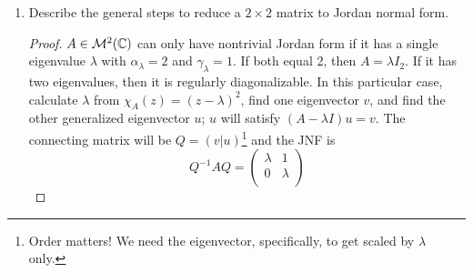 \documentclass[../psets.tex]{subfiles}
\begin{document}
\begin{enumerate}
\begin{proof}
        \begin{equation*}
            J =
            \begin{pmatrix}
                \lambda & 1 &  & 0\\
                 & \lambda & \ddots & \\
                 &  & \ddots & 1\\
                0 &  &  & \lambda\\
            \end{pmatrix}
        \end{equation*}
        the matrix exponential is
        \begin{equation*}
            \e[J] =
            \begin{pmatrix}
                \e[\lambda] & \e[\lambda]/1! &  & \e[\lambda]/(d-1)!\\
                 & \e[\lambda] & \ddots & \\
                 &  & \ddots & \e[\lambda]/1!\\
                0 &  &  & \e[\lambda]\\
            \end{pmatrix}
        \end{equation*}
    \end{proof}
    \item Describe the general steps to reduce a $2\times 2$ matrix to Jordan normal form.
    \begin{proof}
        $A\in\mathcal{M}^2(\mathbb{C})$ can only have nontrivial Jordan form if it has a single eigenvalue $\lambda$ with $\alpha_\lambda=2$ and $\gamma_\lambda=1$. If both equal 2, then $A=\lambda I_2$. If it has two eigenvalues, then it is regularly diagonalizable.
        In this particular case, calculate $\lambda$ from $\chi_A(z)=(z-\lambda)^2$, find one eigenvector $v$, and find the other generalized eigenvector $u$; $u$ will satisfy $(A-\lambda I)u=v$. The connecting matrix will be $Q=(v|u)$\footnote{Order matters! We need the eigenvector, specifically, to get scaled by $\lambda$ only.} and the JNF is
        \begin{equation*}
            Q^{-1}AQ =
            \begin{pmatrix}
                \lambda & 1\\
                0 & \lambda\\
            \end{pmatrix}
        \end{equation*}
    \end{proof}

\end{enumerate}
\end{document}
